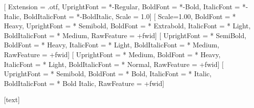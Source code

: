 \setmainfont{LibertinusSerif}[%
  Extension      = .otf,
  UprightFont    = *-Regular,
  BoldFont       = *-Bold,
  ItalicFont     = *-Italic,
  BoldItalicFont = *-BoldItalic,
  Scale          = 1.0]
\setmonofont{Iosevka Term}[%
  Scale=1.00,
  BoldFont        = * Heavy,
  UprightFont     = * Semibold,
  BoldFont        = * Extrabold,
  ItalicFont      = * Light,
  BoldItalicFont  = * Medium,
  RawFeature      = +fwid]
[ %
  UprightFont     = * SemiBold,
  BoldFont        = * Heavy,
  ItalicFont      = * Light,
  BoldItalicFont  = * Medium,
  RawFeature      = +fwid]
[ %
  UprightFont     = * Medium,
  BoldFont        = * Heavy,
  ItalicFont      = * Light,
  BoldItalicFont  = * Normal,
  RawFeature      = +fwid]  
[%
  UprightFont     = * Semibold,
  BoldFont        = * Bold,
  ItalicFont      = * Italic,
  BoldItalicFont  = * Bold Italic,
  RawFeature      = +fwid]
\newCJKfontfamily{}
\newCJKfontfamily{}
\newCJKfontfamily{}
\newCJKfontfamily{} 

{}%
{}%
[text]

